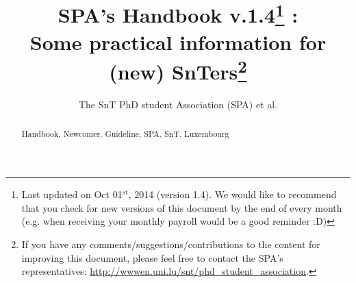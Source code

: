 \documentclass[runningheads,a4paper]{llncs}
\newcommand{\keywords}[1]{\par\addvspace\baselineskip
\noindent\keywordname\enspace\ignorespaces#1}
\begin{document}
\mainmatter  %

\title{SPA's Handbook v.1.4\thanks{Last updated on Oct 01$^{st}$, 2014 (version 1.4). We would like to recommend that you check for new versions of this document by the end of every month (e.g. when receiving your monthly payroll would be a good reminder :D)} : \\
Some practical information for (new) SnTers\thanks{If you have any comments/suggestions/contributions to the content for improving this document, please feel free to contact the SPA's representatives: \url{http://wwwen.uni.lu/snt/phd_student_association}.}}


\author{The SnT PhD student Association (SPA) et al.
}
%

\maketitle

\begin{abstract}


\keywords{Handbook, Newcomer, Guideline, SPA, SnT, Luxembourg}
\end{abstract}

\graphicspath{{Figs/PNG/}{Figs/PDF/}{Figs/}}











%








\end{document}
